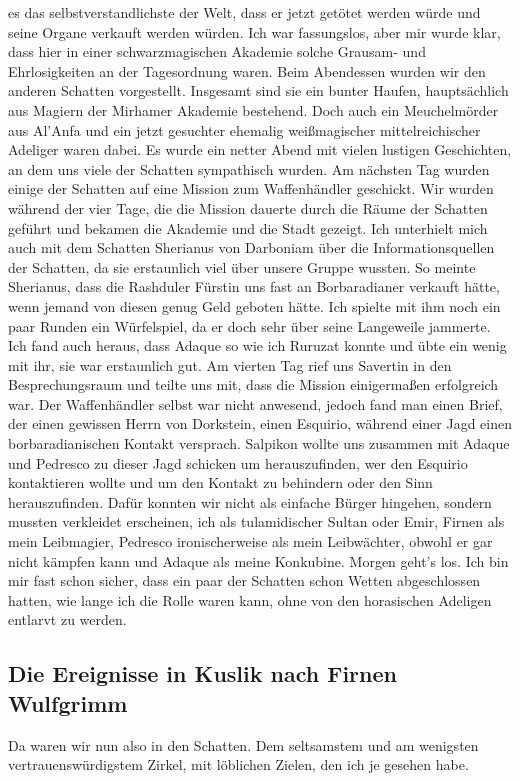 es das selbstverstandlichste der Welt, dass er jetzt getötet werden würde und seine Organe verkauft werden würden. Ich war fassungslos, aber mir wurde klar, dass hier in einer schwarzmagischen Akademie solche Grausam- und Ehrlosigkeiten an der Tagesordnung waren. Beim Abendessen wurden wir den anderen Schatten vorgestellt. Insgesamt sind sie ein bunter Haufen, hauptsächlich aus Magiern der Mirhamer Akademie bestehend. Doch auch ein Meuchelmörder aus Al'Anfa und ein jetzt gesuchter ehemalig weißmagischer mittelreichischer Adeliger waren dabei. Es wurde ein netter Abend mit vielen lustigen Geschichten, an dem uns viele der Schatten sympathisch wurden. Am nächsten Tag wurden einige der Schatten auf eine Mission zum Waffenhändler geschickt. Wir wurden während der vier Tage, die die Mission dauerte durch die Räume der Schatten geführt und bekamen die Akademie und die Stadt gezeigt. Ich unterhielt mich auch mit dem Schatten Sherianus von Darboniam über die Informationsquellen der Schatten, da sie erstaunlich viel über unsere Gruppe wussten. So meinte Sherianus, dass die Rashduler Fürstin uns fast an Borbaradianer verkauft hätte, wenn jemand von diesen genug Geld geboten hätte. Ich spielte mit ihm noch ein paar Runden ein Würfelspiel, da er doch sehr über seine Langeweile jammerte. Ich fand auch heraus, dass Adaque so wie ich Ruruzat konnte und übte ein wenig mit ihr, sie war erstaunlich gut. Am vierten Tag rief uns Savertin in den Besprechungsraum und teilte uns mit, dass die Mission einigermaßen erfolgreich war. Der Waffenhändler selbst war nicht anwesend, jedoch fand man einen Brief, der einen gewissen Herrn von Dorkstein, einen Esquirio, während einer Jagd einen borbaradianischen Kontakt versprach. Salpikon wollte uns zusammen mit Adaque und Pedresco zu dieser Jagd schicken um herauszufinden, wer den Esquirio kontaktieren wollte und um den Kontakt zu behindern oder den Sinn herauszufinden. Dafür konnten wir nicht als einfache Bürger hingehen, sondern mussten verkleidet erscheinen, ich als tulamidischer Sultan oder Emir, Firnen als mein Leibmagier, Pedresco ironischerweise als mein Leibwächter, obwohl er gar nicht kämpfen kann und Adaque als meine Konkubine. Morgen geht’s los. Ich bin mir fast schon sicher, dass ein paar der Schatten schon Wetten abgeschlossen hatten, wie lange ich die Rolle waren kann, ohne von den horasischen Adeligen entlarvt zu werden.

\subsection{Die Ereignisse in Kuslik nach Firnen Wulfgrimm}
Da waren wir nun also in den Schatten. Dem seltsamstem und am wenigsten vertrauenswürdigstem Zirkel, mit löblichen Zielen, den ich je gesehen habe.

